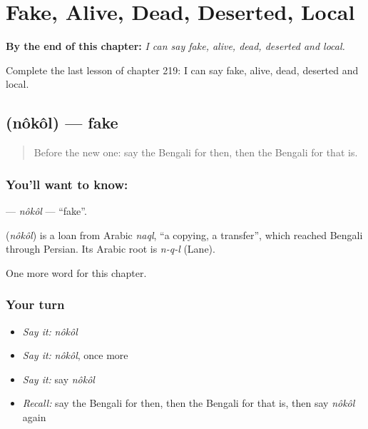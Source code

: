 
\chapter{Fake, Alive, Dead, Deserted, Local}
\label{ch:bn-fake-alive-dead-deserted-local}

\begin{chapteropening}
\textbf{By the end of this chapter:} \emph{I can say fake, alive, dead, deserted and local.}

Complete the last lesson of chapter 219: I can say fake, alive, dead, deserted and local.
\end{chapteropening}

\section[\texorpdfstring{\bn{নকল} (nôkôl)}{নকল (nôkôl)}]{ (nôkôl) — fake}

\label{lesson:BN-C219-nokol}



\begin{quote}
Before the new one: say the Bengali for then, then the Bengali for that is.
\end{quote}

\subsection*{You'll want to know: }
\textbf{} — \emph{nôkôl} — \textquotedblleft{}fake\textquotedblright{}.

\begin{cousinweb}
\textbf{} (\emph{nôkôl}) is a loan from Arabic \emph{naql}, \textquotedblleft{}a copying, a transfer\textquotedblright{}, which reached Bengali through Persian. Its Arabic root is \emph{n-q-l} (Lane).
\end{cousinweb}

\begin{grammarlens}[title={What you've built}]
One more word for this chapter.
\end{grammarlens}

\subsection*{Your turn}
\begin{itemize}
\raggedright
  \item \emph{Say it:} \emph{nôkôl}
  \item \emph{Say it:} \emph{nôkôl}, once more
  \item \emph{Say it:} say \emph{nôkôl}
  \item \emph{Recall:} say the Bengali for then, then the Bengali for that is, then say \emph{nôkôl} again
\end{itemize}

